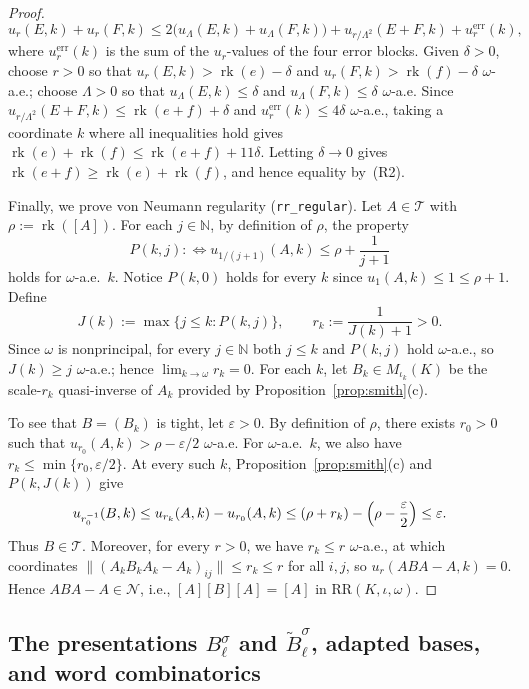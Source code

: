 \documentclass[11pt]{article}
\theoremstyle{definition}
\theoremstyle{remark}
\numberwithin{equation}{section}
\DeclareMathOperator{\rk}{rk}
\newcommand{\RR}{\mathrm{RR}}
\newcommand{\N}{\mathbb{N}}
\newcommand{\TT}{\mathcal{T}}
\newcommand{\NN}{\mathcal{N}}
\newcommand{\1}{\mathbf{1}}
\newcommand{\code}[1]{{\normalfont\small\texttt{#1}}}
\begin{document}
\begin{proof}
\[
u_r(E, k) + u_r(F, k) \le 2\bigl(u_\Lambda(E, k) + u_\Lambda(F, k)\bigr) + u_{r/\Lambda^2}(E + F, k) + u_r^{\mathrm{err}}(k),
\]
where $u_r^{\mathrm{err}}(k)$ is the sum of the $u_r$-values of the four error blocks. Given $\delta > 0$, choose $r > 0$ so that $u_r(E, k) > \rk(e) - \delta$ and $u_r(F, k) > \rk(f) - \delta$ $\omega$-a.e.; choose $\Lambda > 0$ so that $u_\Lambda(E, k) \le \delta$ and $u_\Lambda(F, k) \le \delta$ $\omega$-a.e. Since $u_{r/\Lambda^2}(E + F, k) \le \rk(e + f) + \delta$ and $u_r^{\mathrm{err}}(k) \le 4\delta$ $\omega$-a.e., taking a coordinate $k$ where all inequalities hold gives $\rk(e) + \rk(f) \le \rk(e + f) + 11\delta$. Letting $\delta \to 0$ gives $\rk(e + f) \ge \rk(e) + \rk(f)$, and hence equality by~(R2).

Finally, we prove von Neumann regularity (\code{rr\_regular}). Let $A \in \TT$ with $\rho := \rk([A])$. For each $j \in \N$, by definition of $\rho$, the property
\[
P(k, j) :\iff u_{1/(j+1)}(A, k) \le \rho + \frac{1}{j + 1}
\]
holds for $\omega$-a.e.\ $k$. Notice $P(k, 0)$ holds for every $k$ since $u_1(A, k) \le 1 \le \rho + 1$. Define
\[
J(k) := \max\{j \le k : P(k, j)\}, \qquad r_k := \frac{1}{J(k) + 1} > 0.
\]
Since $\omega$ is nonprincipal, for every $j \in \N$ both $j \le k$ and $P(k, j)$ hold $\omega$-a.e., so $J(k) \ge j$ $\omega$-a.e.; hence $\lim_{k \to \omega} r_k = 0$. For each $k$, let $B_k \in M_{\iota_k}(K)$ be the scale-$r_k$ quasi-inverse of $A_k$ provided by Proposition~\ref{prop:smith}(c).

To see that $B = (B_k)$ is tight, let $\varepsilon > 0$. By definition of $\rho$, there exists $r_0 > 0$ such that $u_{r_0}(A, k) > \rho - \varepsilon/2$ $\omega$-a.e. For $\omega$-a.e.\ $k$, we also have $r_k \le \min\{r_0, \varepsilon/2\}$. At every such $k$, Proposition~\ref{prop:smith}(c) and $P(k, J(k))$ give
\[
u_{r_0^{-1}}(B, k) \le u_{r_k}(A, k) - u_{r_0}(A, k) \le (\rho + r_k) - \Bigl(\rho - \frac{\varepsilon}{2}\Bigr) \le \varepsilon.
\]
Thus $B \in \TT$. Moreover, for every $r > 0$, we have $r_k \le r$ $\omega$-a.e., at which coordinates $\|(A_k B_k A_k - A_k)_{ij}\| \le r_k \le r$ for all $i, j$, so $u_r(ABA - A, k) = 0$. Hence $ABA - A \in \NN$, i.e., $[A][B][A] = [A]$ in $\RR(K, \iota, \omega)$.
\end{proof}

\subsection{The presentations \texorpdfstring{$B_\ell^\sigma$}{B\_l\^{}sigma} and \texorpdfstring{$\widetilde{B}_\ell^\sigma$}{Btilde\_l\^{}sigma}, adapted bases, and word combinatorics}
\end{document}

